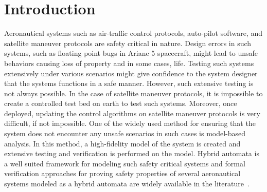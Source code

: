 \section{Introduction}
\label{sec:intro}

Aeronautical systems such as air-traffic control protocols, auto-pilot software, and satellite maneuver protocols are safety critical in nature.
%
Design errors in such systems, such as floating point bugs in Ariane 5 spacecraft, might lead to unsafe behaviors causing loss of property and in some cases, life.
%
Testing such systems extensively under various scenarios might give confidence to the system designer that the systems functions in a safe manner.
%
However, such extensive testing is not always possible. 
%
%
In the case of satellite maneuver protocols, it is impossible to create a controlled test bed on earth to test such systems.
%
Moreover, once deployed, updating the control algorithms on satellite maneuver protocols is very difficult, if not impossible.
%
%
One of the widely used method for ensuring that the system does not encounter any unsafe scenarios in such cases is model-based analysis.
%
In this method, a high-fidelity model of the system is created and extensive testing and verification is performed on the model.
%
%
% 
% 
Hybrid automata is a well suited framework for modeling such safety critical systems and formal verification approaches for proving safety properties of several aeronautical systems modeled as a hybrid automata are widely available in the literature~\cite{tomlin1998conflict,pallottino2002conflict,prabhakar2009verifying,johnson2012satellite,munoz2013tcas,zhao2014formal,duggirala2014temporal,jeannin2015formally}.
%
%
%
%

